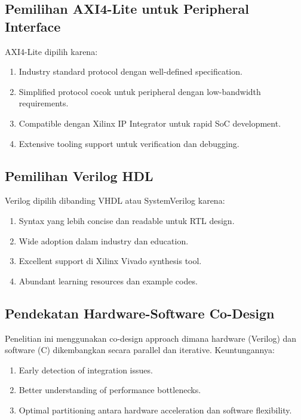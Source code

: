 \subsection{Pemilihan AXI4-Lite untuk Peripheral Interface}

AXI4-Lite dipilih karena:
\begin{enumerate}
	\item Industry standard protocol dengan well-defined specification.
	\item Simplified protocol cocok untuk peripheral dengan low-bandwidth requirements.
	\item Compatible dengan Xilinx IP Integrator untuk rapid SoC development.
	\item Extensive tooling support untuk verification dan debugging.
\end{enumerate}

\subsection{Pemilihan Verilog HDL}

Verilog dipilih dibanding VHDL atau SystemVerilog karena:
\begin{enumerate}
	\item Syntax yang lebih concise dan readable untuk RTL design.
	\item Wide adoption dalam industry dan education.
	\item Excellent support di Xilinx Vivado synthesis tool.
	\item Abundant learning resources dan example codes.
\end{enumerate}

\subsection{Pendekatan Hardware-Software Co-Design}

Penelitian ini menggunakan co-design approach dimana hardware (Verilog) dan software (C) dikembangkan secara parallel dan iterative. Keuntungannya:
\begin{enumerate}
	\item Early detection of integration issues.
	\item Better understanding of performance bottlenecks.
	\item Optimal partitioning antara hardware acceleration dan software flexibility.
\end{enumerate}

